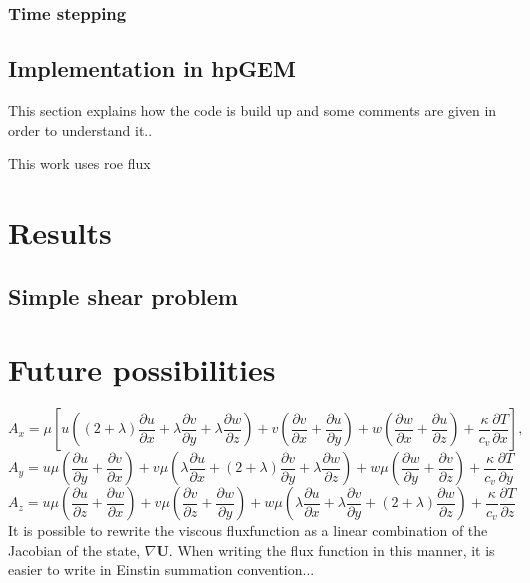 \documentclass{report}
\newcommand{\dx}[1]{\frac{\partial #1}{\partial x}}
\newcommand{\dy}[1]{\frac{\partial #1}{\partial y}}
\newcommand{\dz}[1]{\frac{\partial #1}{\partial z}}
\begin{document}
\subsection{Time stepping}


\section{Implementation in hpGEM}
This section explains how the code is build up and some comments are given in order to understand it..

This work uses roe flux

\chapter{Results}
\section{Simple shear problem}

\chapter{Future possibilities}

\begin{equation}
\label{e:energyBalance_AxLong}
A_x = \mu \left [
u \left( (2+\lambda)\dx{u} + \lambda \dy{v} + \lambda \dz{w} \right)
+ v \left( \dx{v} + \dy{u} \right) 
+ w \left( \dx{w} + \dz{u} \right)
+ \frac{\kappa}{c_v} \dx{T}
\right],
\end{equation}
\begin{equation}
\label{e:energyBalance_AyLong}
A_y = u \mu \left( \dy{u} + \dx{v} \right)
+ v \mu \left( \lambda \dx{u} + (2+\lambda)\dy{v} + \lambda \dz{w} \right)
+ w \mu \left( \dy{w} + \dz{v} \right)
+ \frac{\kappa}{c_v}\dy{T}
\end{equation}
\begin{equation}
\label{e:energyBalance_AzLong}
A_z = u \mu \left( \dz{u} + \dx{w} \right)
+ v \mu \left( \dz{v} + \dy{w} \right)
+ w \mu \left( \lambda\dx{u} + \lambda\dy{v} + (2+\lambda)\dz{w} \right)
+ \frac{\kappa}{c_v}\dz{T}
\end{equation}
It is possible to rewrite the viscous fluxfunction as a linear combination of the Jacobian of the state, $\nabla \mathbf{U}$. When writing the flux function in this manner, it is easier to write in Einstin summation convention...

\end{document}
